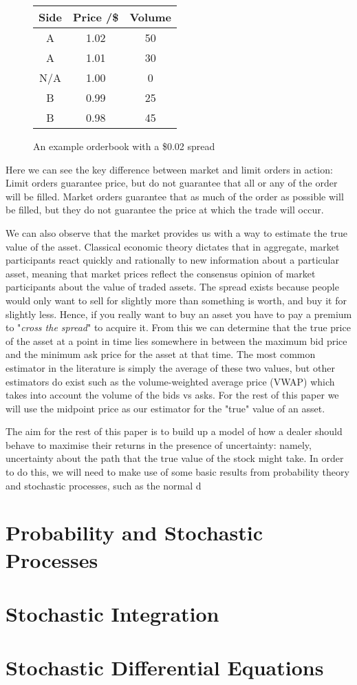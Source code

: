 \begin{figure}
\centering
    \begin{tabular}{ |c|c|c| } 
        \hline
        Side & Price /\$ & Volume \\ 
        \hline
        A & 1.02 & 50 \\
        A & 1.01 & 30 \\
        N/A & 1.00 & 0 \\
        B & 0.99 & 25 \\ 
        B & 0.98 & 45 \\
        \hline
    \end{tabular}
    \caption{An example orderbook with a \$0.02 spread}
    \label{fig:orderbook}
\end{figure}

Here we can see the key difference between market and limit orders in action: Limit orders guarantee price, but do not guarantee that all or any of the order will be filled. Market orders guarantee that as much of the order as possible will be filled, but they do not guarantee the price at which the trade will occur.

We can also observe that the market provides us with a way to estimate the true value of the asset. Classical economic theory dictates that in aggregate, market participants react quickly and rationally to new information about a particular asset, meaning that market prices reflect the consensus opinion of market participants about the value of traded assets. The spread exists because people would only want to sell for slightly more than something is worth, and buy it for slightly less. Hence, if you really want to buy an asset you have to pay a premium to "\textit{cross the spread}" to acquire it. From this we can determine that the true price of the asset at a point in time lies somewhere in between the maximum bid price and the minimum ask price for the asset at that time. The most common estimator in the literature is simply the average of these two values, but other estimators do exist such as the volume-weighted average price (VWAP) which takes into account the volume of the bids vs asks. For the rest of this paper we will use the midpoint price as our estimator for the "true" value of an asset.

The aim for the rest of this paper is to build up a model of how a dealer should behave to maximise their returns in the presence of uncertainty: namely, uncertainty about the path that the true value of the stock might take. In order to do this, we will need to make use of some basic results from probability theory and stochastic processes, such as the normal d
\section{Probability and Stochastic Processes}
\section{Stochastic Integration}
\section{Stochastic Differential Equations}
